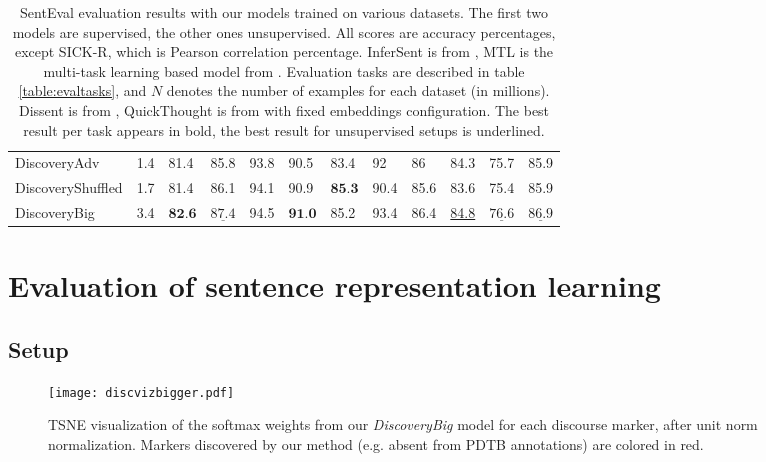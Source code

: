 \documentclass[11pt,a4paper]{article}
\begin{document}
\begin{table*}[htb]
\begin{small}
\begin{tabular}{lrllllllllll}
DiscoveryAdv      &    1.4 &             81.4 &                85.8 &             93.8 &             90.5 &             83.4 &               92 &                  86 &             84.3 &                75.7 &                85.9 \\
DiscoveryShuffled &    1.7 &             81.4 &                86.1 &             94.1 &             90.9 &  $\textbf{85.3}$ &             90.4 &                85.6 &             83.6 &                75.4 &                85.9 \\
DiscoveryBig      &    3.4 &  $\textbf{82.6}$ &  $\underline{87.4}$ &             94.5 &  $\textbf{91.0}$ &             85.2 &             93.4 &                86.4 &             \underline{84.8} &  $\underline{76.6}$ &  $\underline{86.9}$ \\
\bottomrule
\end{tabular}

 \caption{SentEval evaluation results with our models trained on various datasets.
 The first two models are supervised, the other ones unsupervised. All scores are accuracy percentages, except SICK-R, which is Pearson correlation percentage.
InferSent is from  \citet{Conneau2017},
 MTL is the multi-task learning based model from \citet{subramanian2018learning}.
 Evaluation tasks are described in table \ref{table:evaltasks}, and $N$ denotes the number of examples for each dataset (in millions).
 Dissent is from \citet{Nie2017}, QuickThought is from \citet{Logeswaran2018} with fixed embeddings configuration. 
 The best result per task appears in bold, the best result for unsupervised setups is underlined.
 \label{table:ressenteval}
 }
\end{small}
\end{table*}





\section{Evaluation of sentence representation learning}
\subsection{Setup}
\begin{figure*}[htb]
  \centering
\texttt{[image: discvizbigger.pdf]}
\caption{TSNE visualization of the softmax weights from our \textit{DiscoveryBig} model for each discourse marker, after unit norm normalization. Markers discovered by our method (e.g. absent from PDTB annotations) are colored in red.}
\label{fig:tsne} 
\end{figure*}
\end{document}
